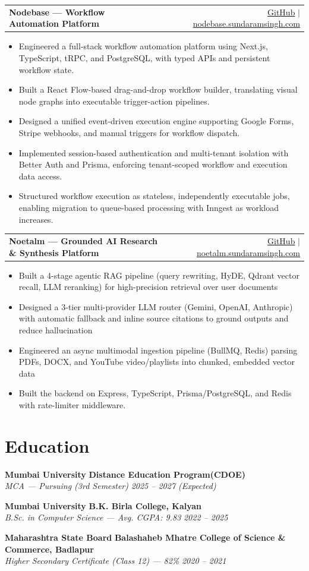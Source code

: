 \documentclass[a4paper,10pt]{article}
\makeatletter
\newenvironment{joblong}[2]
    {
    \begin{tabularx}{\linewidth}{@{}l X r@{}}
    \textbf{#1} & \hfill &  #2 \\[1pt]
    \end{tabularx}
    \begin{minipage}[t]{\linewidth}
    \begin{itemize}[nosep,after=\strut, leftmargin=1em, itemsep=0pt,topsep=0pt]
    }
    {
    \end{itemize}
    \end{minipage}    
    }
\makeatother
\begin{document}
\begin{joblong}{Nodebase — Workflow Automation Platform}{\href{https://github.com/sundaram26/nodebase}{GitHub} $|$ \href{https://nodebase.sundaramsingh.com}{nodebase.sundaramsingh.com}}
\item Engineered a full-stack workflow automation platform using Next.js, TypeScript, tRPC, and PostgreSQL, with typed APIs and persistent workflow state.
\item Built a React Flow-based drag-and-drop workflow builder, translating visual node graphs into executable trigger-action pipelines.
\item Designed a unified event-driven execution engine supporting Google Forms, Stripe webhooks, and manual triggers for workflow dispatch.
\item Implemented session-based authentication and multi-tenant isolation with Better Auth and Prisma, enforcing tenant-scoped workflow and execution data access.
\item Structured workflow execution as stateless, independently executable jobs, enabling migration to queue-based processing with Inngest as workload increases.
\end{joblong}

\begin{joblong}{Noetalm — Grounded AI Research \& Synthesis Platform}{\href{https://github.com/sundaram26/mybooklm}{GitHub} $|$ \href{https://noetalm.sundaramsingh.com}{noetalm.sundaramsingh.com}}
\item Built a 4-stage agentic RAG pipeline (query rewriting, HyDE, Qdrant vector recall, LLM reranking) for high-precision retrieval over user documents
\item Designed a 3-tier multi-provider LLM router (Gemini, OpenAI, Anthropic) with automatic fallback and inline source citations to ground outputs and reduce hallucination
\item Engineered an async multimodal ingestion pipeline (BullMQ, Redis) parsing PDFs, DOCX, and YouTube video/playlists into chunked, embedded vector data
\item Built the backend on Express, TypeScript, Prisma/PostgreSQL, and Redis with rate-limiter middleware.
\end{joblong}

\section{Education}
\noindent \textbf{Mumbai University} \hfill \textbf{Distance Education Program(CDOE)} \\
\textit{MCA — Pursuing (3rd Semester)} \hfill \textit{2025 – 2027 (Expected)}

\vspace{1pt}
\noindent \textbf{Mumbai University} \hfill \textbf{B.K. Birla College, Kalyan} \\
\textit{B.Sc. in Computer Science — Avg. CGPA: 9.83} \hfill \textit{2022 – 2025}

\vspace{1pt}
\noindent \textbf{Maharashtra State Board} \hfill \textbf{Balashaheb Mhatre College of Science \& Commerce, Badlapur} \\
\textit{Higher Secondary Certificate (Class 12) — 82\%} \hfill \textit{2020 – 2021}
\end{document}
